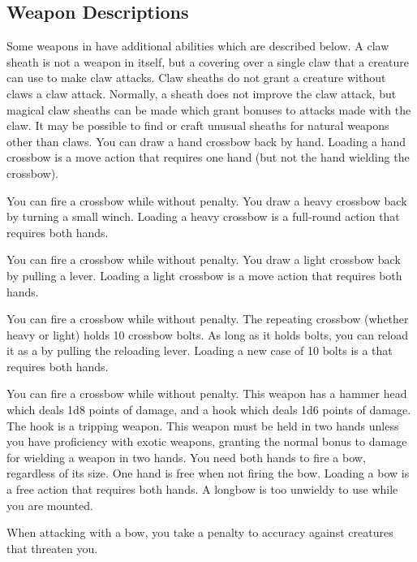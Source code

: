 \subsection{Weapon Descriptions}
Some weapons in  have additional abilities which are described below.
 A claw sheath is not a weapon in itself, but a covering over a single claw that a creature can use to make claw attacks. Claw sheaths do not grant a creature without claws a claw attack. Normally, a sheath does not improve the claw attack, but magical claw sheaths can be made which grant bonuses to attacks made with the claw. It may be possible to find or craft unusual sheaths for natural weapons other than claws.
 You can draw a hand crossbow back by hand. Loading a hand crossbow is a move action that requires one hand (but not the hand wielding the crossbow).
\par You can fire a crossbow while \prone without penalty.
 You draw a heavy crossbow back by turning a small winch. Loading a heavy crossbow is a full-round action that requires both hands.
\par You can fire a crossbow while \prone without penalty.
 You draw a light crossbow back by pulling a lever. Loading a light crossbow is a move action that requires both hands.
\par You can fire a crossbow while \prone without penalty.
 The repeating crossbow (whether heavy or light) holds 10 crossbow bolts. As long as it holds bolts, you can reload it as a  by pulling the reloading lever. Loading a new case of 10 bolts is a  that requires both hands.
\par You can fire a crossbow while \prone without penalty.
 This weapon has a hammer head which deals 1d8 points of damage, and a hook which deals 1d6 points of damage. The hook is a tripping weapon.
 This weapon must be held in two hands unless you have proficiency with exotic weapons, granting the normal  bonus to damage for wielding a weapon in two hands.
 You need both hands to fire a bow, regardless of its size. One hand is free when not firing the bow. Loading a bow is a free action that requires both hands. A longbow is too unwieldy to use while you are mounted.
\par When attacking with a bow, you take a  penalty to accuracy against creatures that threaten you.
